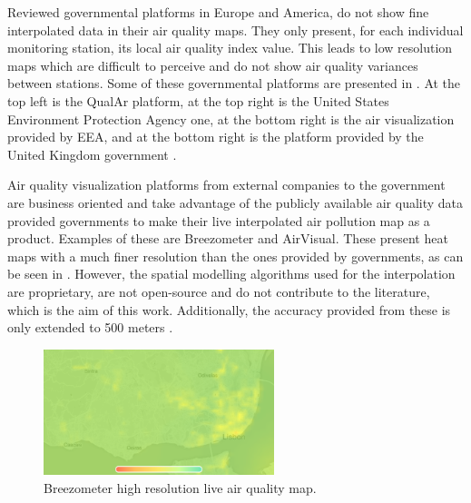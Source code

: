 Reviewed governmental platforms in Europe and America, do not show fine interpolated data in their air quality maps. They only present, for each individual monitoring station, its local air quality index value. This leads to low resolution maps which are difficult to perceive and do not show air quality variances between stations. Some of these governmental platforms are presented in . At the top left is the QualAr platform, at the top right is the United States Environment Protection Agency one, at the bottom right is the air visualization provided by EEA, and at the bottom right is the platform provided by the United Kingdom government \cite{QualAr}\cite{U.S.EnvironmentProtectionAgency}\cite{EEA}\cite{DepartmentforEnvironment}.


Air quality visualization platforms from external companies to the government are business oriented and take advantage of the publicly available air quality data provided governments to make their live interpolated air pollution map as a product. Examples of these are Breezometer and AirVisual. These present heat maps with a much finer resolution than the ones provided by governments, as can be seen in  \cite{Breezometer}. However, the spatial modelling algorithms used for the interpolation are proprietary, are not open-source and do not contribute to the literature, which is the aim of this work. Additionally, the accuracy provided from these is only extended to 500 meters \cite{Breezometera}.

\begin{figure}[ht]
\centering
\includegraphics[width=0.6\textwidth]{./Images/breezo-visualization.png}
\caption{Breezometer high resolution live air quality map.}
\label{fig:breezo-visualization}
\end{figure}


    
